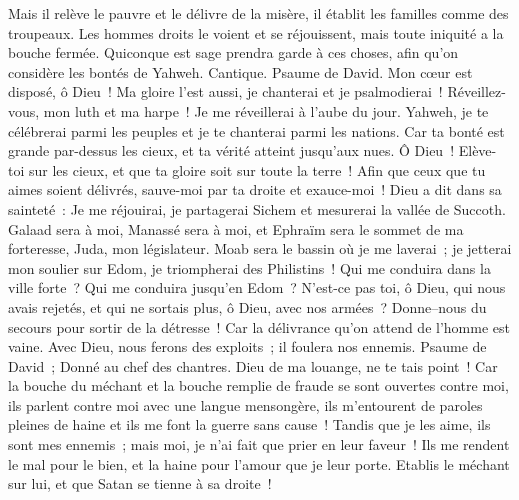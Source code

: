 \begin{multicols}{2}
Mais il relève le pauvre et le délivre de la misère, il établit les familles comme des troupeaux.
Les hommes droits le voient et se réjouissent, mais toute iniquité a la bouche fermée.
Quiconque est sage prendra garde à ces choses, afin qu'on considère les bontés de Yahweh.
\VerseOne{}Cantique. Psaume de David. Mon cœur est disposé, ô Dieu~! Ma gloire l'est aussi, je chanterai et je psalmodierai~!
Réveillez-vous, mon luth et ma harpe~! Je me réveillerai à l'aube du jour.
Yahweh, je te célébrerai parmi les peuples et je te chanterai parmi les nations.
Car ta bonté est grande par-dessus les cieux, et ta vérité atteint jusqu'aux nues.
Ô Dieu~! Elève-toi sur les cieux, et que ta gloire soit sur toute la terre~!
Afin que ceux que tu aimes soient délivrés, sauve-moi par ta droite et exauce-moi~!
Dieu a dit dans sa sainteté~: Je me réjouirai, je partagerai Sichem et mesurerai la vallée de Succoth.
Galaad sera à moi, Manassé sera à moi, et Ephraïm sera le sommet de ma forteresse, Juda, mon législateur.
Moab sera le bassin où je me laverai~; je jetterai mon soulier sur Edom, je triompherai des Philistins~!
Qui me conduira dans la ville forte~? Qui me conduira jusqu'en Edom~?
N'est-ce pas toi, ô Dieu, qui nous avais rejetés, et qui ne sortais plus, ô Dieu, avec nos armées~?
Donne–nous du secours pour sortir de la détresse~! Car la délivrance qu'on attend de l'homme est vaine.
Avec Dieu, nous ferons des exploits~; il foulera nos ennemis.
\VerseOne{}Psaume de David~; Donné au chef des chantres. Dieu de ma louange, ne te tais point~!
Car la bouche du méchant et la bouche remplie de fraude se sont ouvertes contre moi, ils parlent contre moi avec une langue mensongère,
ils m'entourent de paroles pleines de haine et ils me font la guerre sans cause~!
Tandis que je les aime, ils sont mes ennemis~; mais moi, je n'ai fait que prier en leur faveur~!
Ils me rendent le mal pour le bien, et la haine pour l'amour que je leur porte.
Etablis le méchant sur lui, et que Satan se tienne à sa droite~!

\end{multicols}
